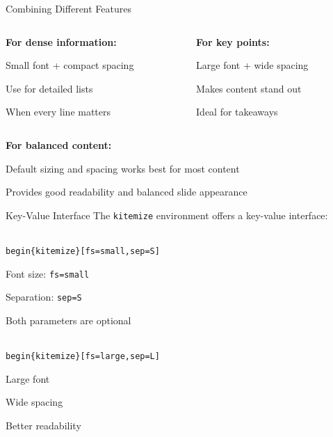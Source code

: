 \documentclass[11pt,compress,t,notes=noshow, xcolor=table]{beamer}
\begin{document}
\begin{frame}{Combining Different Features}
  
  \begin{columns}[T]
    \begin{column}{0.48\textwidth}
      \textbf{For dense information:}
      \begin{itemizeS}[small]
        \item Small font + compact spacing
        \item Use for detailed lists
        \item When every line matters
      \end{itemizeS}
    \end{column}
    
    \begin{column}{0.48\textwidth}
      \textbf{For key points:}
      \begin{itemizeL}[large]
        \item Large font + wide spacing
        \item Makes content stand out
        \item Ideal for takeaways
      \end{itemizeL}
    \end{column}
  \end{columns}
  
  \vspace{0.5cm}
  \textbf{For balanced content:}
  \begin{itemizeM}
    \item Default sizing and spacing works best for most content
    \item Provides good readability and balanced slide appearance
  \end{itemizeM}
\end{frame}


\begin{frame}{Key-Value Interface}
  The \texttt{kitemize} environment offers a key-value interface:
  
  \vspace{1ex}
  \texttt{\\begin\{kitemize\}[fs=small,sep=S]}
  \begin{kitemize}[fs=small,sep=S]
    \item Font size: \texttt{fs=small}
    \item Separation: \texttt{sep=S}
    \item Both parameters are optional
  \end{kitemize}
  
  \vspace{1ex}
  \texttt{\\begin\{kitemize\}[fs=large,sep=L]}
  \begin{kitemize}[fs=large,sep=L]
    \item Large font
    \item Wide spacing
    \item Better readability
  \end{kitemize}
\end{frame}
\end{document}
